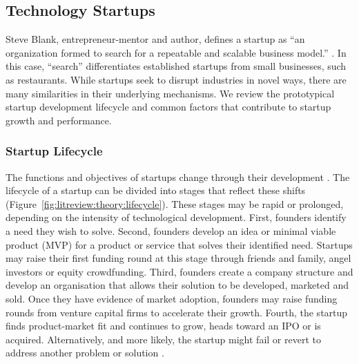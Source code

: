\documentclass[../thesis/thesis.tex]{subfiles}
\begin{document}
\begin{refsection}
\subsection{Technology Startups}

Steve Blank, entrepreneur-mentor and author, defines a startup as ``an organization formed to search for a repeatable and scalable business model.'' \cite{blank2010}. In this case, ``search'' differentiates established startups from small businesses, such as restaurants. While startups seek to disrupt industries in novel ways, there are many similarities in their underlying mechanisms. We review the prototypical startup development lifecycle and common factors that contribute to startup growth and performance.

\subsubsection{Startup Lifecycle}

The functions and objectives of startups change through their development \cite{mcmullen2013}. The lifecycle of a startup can be divided into stages that reflect these shifts (Figure~\ref{fig:litreview:theory:lifecycle}). These stages may be rapid or prolonged, depending on the intensity of technological development. First, founders identify a need they wish to solve. Second, founders develop an idea or minimal viable product (MVP) for a product or service that solves their identified need. Startups may raise their first funding round at this stage through friends and family, angel investors or equity crowdfunding. Third, founders create a company structure and develop an organisation that allows their solution to be developed, marketed and sold. Once they have evidence of market adoption, founders may raise funding rounds from venture capital firms to accelerate their growth. Fourth, the startup finds product-market fit and continues to grow, heads toward an IPO or is acquired. Alternatively, and more likely, the startup might fail or revert to address another problem or solution \cite{hall2010}.


\end{refsection}
\end{document}
